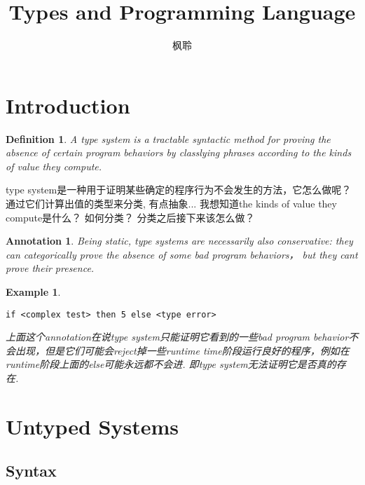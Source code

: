 \documentclass{article}
\theoremstyle{plain}
\newtheorem{example}[theorem]{Example}
\newtheorem{definition}[theorem]{Definition}
\newtheorem{annotation}[theorem]{Annotation}
\theoremstyle{nonumberplain}
\begin{document}
\title{Types and Programming Language}
\author{枫聆}
\maketitle
\tableofcontents

\newpage
\section{Introduction}

\begin{definition}
\rm A {\color{red} type system} is a tractable syntactic method for proving the absence of certain program behaviors by classlying phrases according to the kinds of value they compute.
\end{definition}

{\color{blue} type system是一种用于证明某些确定的程序行为不会发生的方法，它怎么做呢？通过它们计算出值的类型来分类, 有点抽象... 我想知道the kinds of value they compute是什么？ 如何分类？ 分类之后接下来该怎么做？}

\begin{annotation}
\rm Being static, type systems are necessarily also {\color{red}conservative}: they can categorically prove the absence of some bad program behaviors， but they cant prove their presence.
\end{annotation}

\lstset{numbers=left, numberstyle=\tiny, stepnumber=2, numbersep=5pt}

\begin{example}
\rm
\begin{lstlisting}
if <complex test> then 5 else <type error>
\end{lstlisting}
{\color{blue} 上面这个annotation在说type system只能证明它看到的一些bad program behavior不会出现，但是它们可能会reject掉一些runtime time阶段运行良好的程序，例如在runtime阶段上面的else可能永远都不会进. 即type system无法证明它是否真的存在}.
\end{example}

\newpage
\section{Untyped Systems}

\subsection{Syntax}
\end{document}

